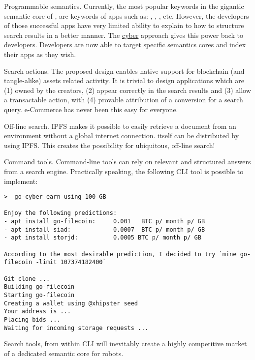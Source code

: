\documentclass[8pt,oneside]{amsart}
\newcommand{\linkred}[2]{\href{#1}{\color{red}{#2}}}
\begin{document}
Programmable semantics. Currently, the most popular keywords in the gigantic semantic core of \linkred{https://google.com}{Google}, are keywords of apps such as: \linkred{https://youtube.com}{Youtube}, \linkred{https://facebook.com}{Facebook}, \linkred{https://github.com}{GitHub}, etc. However, the developers of those successful apps have very limited ability to explain to \linkred{https://google.com}{Google} how to structure search results in a better manner. The {\hyperref[cyber]{cyber}} approach gives this power back to developers. Developers are now able to target specific semantics cores and index their apps as they wish.

Search actions. The proposed design enables native support for blockchain (and tangle-alike) assets related activity. It is trivial to design applications which are (1) owned by the creators, (2) appear correctly in the search results and (3) allow a transactable action, with (4) provable attribution of a conversion for a search query. e-Commerce has never been this easy for everyone.

Off-line search. IPFS makes it possible to easily retrieve a document from an environment without a global internet connection. \linkred{https://github.com/cybercongress/go-cyber}{go-cyber} itself can be distributed by using IPFS. This creates the possibility for ubiquitous, off-line search!

Command tools. Command-line tools can rely on relevant and structured answers from a search engine. Practically speaking, the following CLI tool is possible to implement:

\begin{lstlisting}
>  go-cyber earn using 100 GB

Enjoy the following predictions:
- apt install go-filecoin:     0.001   BTC p/ month p/ GB
- apt install siad:            0.0007  BTC p/ month p/ GB
- apt install storjd:          0.0005 BTC p/ month p/ GB

According to the most desirable prediction, I decided to try `mine go-filecoin -limit 107374182400`

Git clone ...
Building go-filecoin
Starting go-filecoin
Creating a wallet using @xhipster seed
Your address is ...
Placing bids ...
Waiting for incoming storage requests ...
\end{lstlisting}

Search tools, from within CLI will inevitably create a highly competitive market of a dedicated semantic core for robots.
\end{document}
